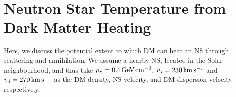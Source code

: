 \section{Neutron Star Temperature from Dark Matter  Heating}
\label{ch6:sec:temperature}




Here, we discuss the potential extent to which DM can heat an NS through scattering and annihilation.
We assume a nearby NS, located in the Solar neighbourhood, and thus take $\rho_\chi=0.4{\rm \,GeV}{\rm \,cm}^{-3}$, $v_\star=230{\rm \,km}{\rm \,s}^{-1}$ and $v_d=270{\rm \,km}{\rm \,s}^{-1}$ as the DM density, NS velocity, and DM dispersion velocity respectively. 
%


